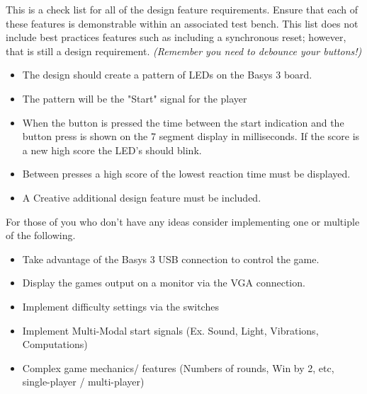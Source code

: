 This is a check list for all of the design feature requirements. Ensure that each of these features is demonstrable within an associated test bench. This list does not include best practices features such as including a synchronous reset; however, that is still a design requirement. \textit{(Remember you need to debounce your buttons!)}

\begin{itemize}
    \item The design should create a pattern of LEDs on the Basys 3 board. 
    \item The pattern will be the "Start" signal for the player
    \item When the button is pressed the time between the start indication and the button press is shown on the 7 segment display in milliseconds. If the score is a new high score the LED's should blink.
    \item Between presses a high score of the lowest reaction time must be displayed.
    \item A Creative additional design feature must be included. 
\end{itemize}

For those of you who don't have any ideas consider implementing one or multiple of the following.

\begin{itemize}
    \item Take advantage of the Basys 3 USB connection to control the game.
    \item Display the games output on a monitor via the VGA connection.
    \item Implement difficulty settings via the switches
    \item Implement Multi-Modal start signals (Ex. Sound, Light, Vibrations, Computations)
    \item Complex game mechanics/ features (Numbers of rounds, Win by 2, etc, single-player / multi-player)
\end{itemize}